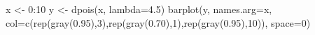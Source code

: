 \begin{Schunk}
\begin{Sinput}
 x <- 0:10
 y <- dpois(x, lambda=4.5)
 barplot(y, names.arg=x, col=c(rep(gray(0.95),3),rep(gray(0.70),1),rep(gray(0.95),10)), space=0)
\end{Sinput}
\end{Schunk}
